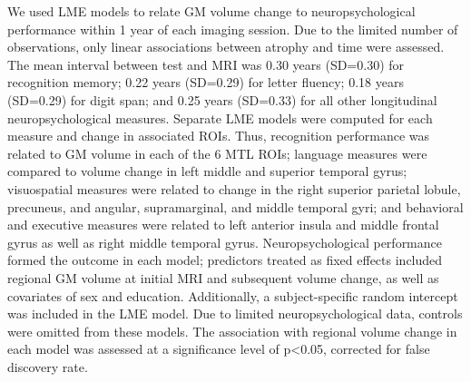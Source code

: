 \documentclass[]{article}
\begin{document}
We used LME models to relate GM volume change to neuropsychological
performance within 1 year of each imaging session. Due to the limited
number of observations, only linear associations between atrophy and
time were assessed. The mean interval between test and MRI was 0.30
years (SD=0.30) for recognition memory; 0.22 years (SD=0.29) for letter
fluency; 0.18 years (SD=0.29) for digit span; and 0.25 years (SD=0.33)
for all other longitudinal neuropsychological measures. Separate LME
models were computed for each measure and change in associated ROIs.
Thus, recognition performance was related to GM volume in each of the 6
MTL ROIs; language measures were compared to volume change in left
middle and superior temporal gyrus; visuospatial measures were related
to change in the right superior parietal lobule, precuneus, and angular,
supramarginal, and middle temporal gyri; and behavioral and executive
measures were related to left anterior insula and middle frontal gyrus
as well as right middle temporal gyrus. Neuropsychological performance
formed the outcome in each model; predictors treated as fixed effects
included regional GM volume at initial MRI and subsequent volume change,
as well as covariates of sex and education. Additionally, a
subject-specific random intercept was included in the LME model. Due to
limited neuropsychological data, controls were omitted from these
models. The association with regional volume change in each model was
assessed at a significance level of p\textless{}0.05, corrected for
false discovery rate.
\end{document}
